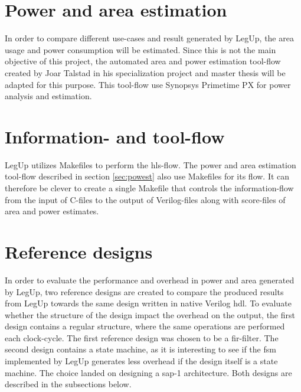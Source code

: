 \section{\label{sec:powest}Power and area estimation}
In order to compare different use-cases and result generated by LegUp, the area usage and power consumption will be estimated. Since this is not the main objective of this project, the automated area and power estimation tool-flow created by Joar Talstad in his specialization project \cite{talstad14project} and master thesis \cite{talstad15master} will be adapted for this purpose. This tool-flow use Synopsys Primetime PX for power analysis and estimation.

\section{Information- and tool-flow}
LegUp utilizes Makefiles to perform the \gls{hls}-flow. The power and area estimation tool-flow described in section \ref{sec:powest} also use Makefiles for its flow. It can therefore be clever to create a single Makefile that controls the information-flow from the input of C-files to the output of Verilog-files along with score-files of area and power estimates. 

\section{Reference designs}
\label{sec:refdes}
In order to evaluate the performance and overhead in power and area generated by LegUp, two reference designs are created to compare the produced results from LegUp towards the same design written in native Verilog \gls{hdl}. To evaluate whether the structure of the design impact the overhead on the output, the first design contains a regular structure, where the same operations are performed each clock-cycle. The first reference design was chosen to be a \gls{fir}-filter. The second design contains a state machine, as it is interesting to see if the \gls{fsm} implemented by LegUp generates less overhead if the design itself is a state machine. The choice landed on designing a \gls{sap-1} architecture. Both designs are described in the subsections below.

